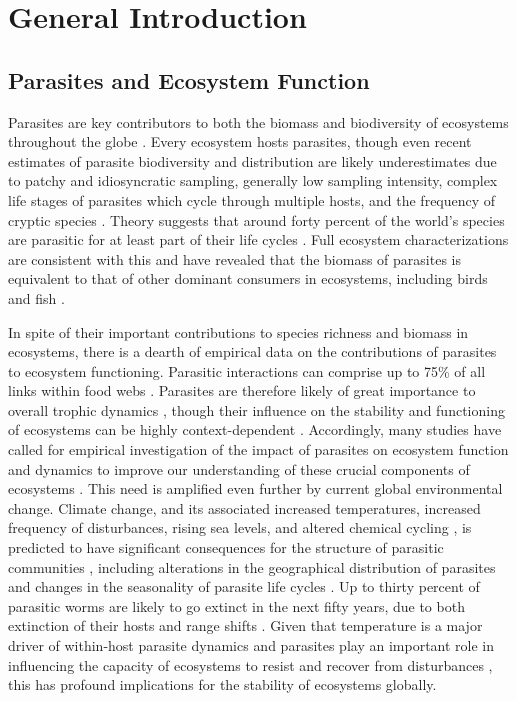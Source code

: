 \chapter{General Introduction}
\label{chap:introduction}
%
% 


\section{Parasites and Ecosystem Function}
Parasites are key contributors to both the biomass and biodiversity of ecosystems throughout the globe \citep{amundsen2009, dobson2008, jorge2018}. Every ecosystem hosts parasites, though even recent estimates of parasite biodiversity and distribution are likely underestimates due to patchy and idiosyncratic sampling, generally low sampling intensity, complex life stages of parasites which cycle through multiple hosts, and the frequency of cryptic species \citep{dallas2017, jorge2018, poulin2018}. Theory suggests that around forty percent of the world’s species are parasitic for at least part of their life cycles \citep{dobson2008}. Full ecosystem characterizations are consistent with this \citep{grabner2017, kruis2008, lafferty2006parasites, lafferty2006food} and have revealed that the biomass of parasites is equivalent to that of other dominant consumers in ecosystems, including birds and fish \citep{kruis2008}. 

In spite of their important contributions to species richness and biomass in ecosystems, there is a dearth of empirical data on the contributions of parasites to ecosystem functioning. Parasitic interactions can comprise up to 75\% of all links within food webs \citep{dunne2013, sukhdeo2012}. Parasites are therefore likely of great importance to overall trophic dynamics \citep{amundsen2009, hernandez2008}, though their influence on the stability and functioning of ecosystems can be highly context-dependent \citep{benesh2008, perrot2014}. Accordingly, many studies have called for empirical investigation of the impact of parasites on ecosystem function and dynamics to improve our understanding of these crucial components of ecosystems \citep{blasco2017, carlson2017, vannatta2018}. This need is amplified even further by current global environmental change. Climate change, and its associated increased temperatures, increased frequency of disturbances, rising sea levels, and altered chemical cycling \citep{ipcc2014}, is predicted to have significant consequences for the structure of parasitic communities \citep{brooks2007, dobson2008}, including alterations in the geographical distribution of parasites and changes in the seasonality of parasite life cycles \citep{lafferty2009}. Up to thirty percent of parasitic worms are likely to  go extinct in the next fifty years, due to both extinction of their hosts and range shifts \citep{carlson2017}. Given that temperature is a major driver of within-host parasite dynamics \citep{kirk2018} and parasites play an important role in influencing the capacity of ecosystems to resist and recover from disturbances \citep{brooks2007}, this has profound implications for the stability of ecosystems globally.

